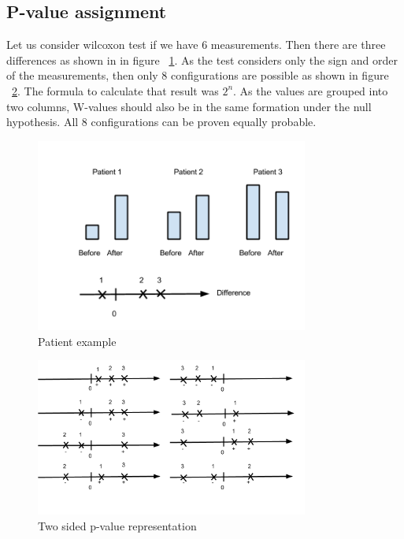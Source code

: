 \documentclass[12pt]{article}
\begin{document}
\subsection{P-value assignment}
Let us consider wilcoxon test if we have 6 measurements. Then there are three differences as shown in in figure ~\ref{fig:patientExample}. As the test considers only the sign and order of the measurements, then only 8 configurations are possible as shown in figure ~\ref{fig:rankSignsExample}. The formula to calculate that result was $2^n$. As the values are grouped into two columns, W-values should also be in the same formation under the null hypothesis. All 8 configurations can be proven equally probable.
\begin{figure}
  \centering
  \includegraphics[width=0.8\textwidth]{patientExample}
  \caption{Patient example}
  \label{fig:patientExample}
\end{figure}

\begin{figure}
  \centering
  \includegraphics[width=0.8\textwidth]{rankSignsExample}
  \caption{Two sided p-value representation}
  \label{fig:rankSignsExample}
\end{figure}
\end{document}
